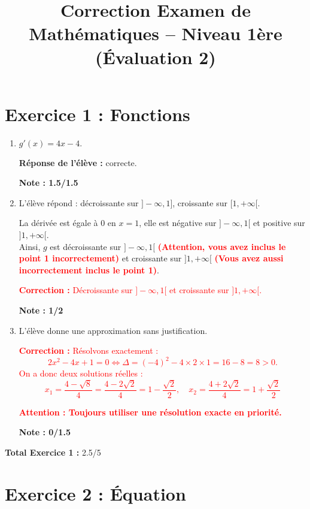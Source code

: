 \documentclass{article}
\begin{document}
\title{Correction Examen de Mathématiques – Niveau 1ère (Évaluation 2)}
\maketitle

\section*{Exercice 1 : Fonctions}

\begin{enumerate}
    \item $g'(x) = 4x - 4.$ 
    
    \textbf{Réponse de l'élève :} correcte. 
    
    \textbf{Note : 1.5/1.5}

    \item L'élève répond : décroissante sur $]-\infty,1]$, croissante sur $[1,+\infty[.$
    
    La dérivée est égale à 0 en $x=1$, elle est négative sur $]-\infty,1[$ et positive sur $]1,+\infty[$. \\ Ainsi, $g$ est décroissante sur $]-\infty,1[$ \textcolor{red}{\textbf{(Attention, vous avez inclus le point 1 incorrectement)}} et croissante sur $]1,+\infty[$ \textcolor{red}{\textbf{(Vous avez aussi incorrectement inclus le point 1)}}.
    
    \textcolor{red}{\textbf{Correction : } Décroissante sur $]-\infty,1[$ et croissante sur $]1,+\infty[$.}
    
    \textbf{Note : 1/2}

    \item L'élève donne une approximation sans justification. 
    
    \textcolor{red}{\textbf{Correction : }Résolvons exactement : 
    \[
    2x^2 -4x+1=0 \Longleftrightarrow \Delta = (-4)^2 - 4\times 2\times 1 = 16 -8 =8>0.
    \]
    On a donc deux solutions réelles : 
    \[
    x_1=\frac{4-\sqrt{8}}{4}=\frac{4-2\sqrt{2}}{4}=1-\frac{\sqrt{2}}{2},\quad x_2=\frac{4+2\sqrt{2}}{4}=1+\frac{\sqrt{2}}{2}
    \]}

    \textcolor{red}{\textbf{Attention : Toujours utiliser une résolution exacte en priorité.}}

    \textbf{Note : 0/1.5}
\end{enumerate}

\textbf{Total Exercice 1 :} 2.5/5

\section*{Exercice 2 : Équation}
\end{document}
